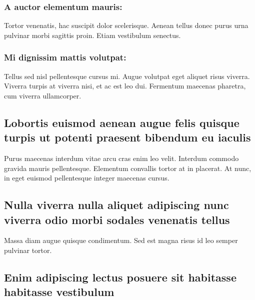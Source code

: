 \documentclass[
]{HyperedReport}
\begin{document}
\subsubsection{A auctor elementum mauris:}

Tortor venenatis, hac suscipit dolor scelerisque. Aenean tellus donec purus urna pulvinar morbi sagittis proin. Etiam vestibulum senectus.

\subsubsection{Mi dignissim mattis volutpat:}

Tellus sed nisl pellentesque cursus mi. Augue volutpat eget aliquet risus viverra. Viverra turpis at viverra nisi, et ac est leo dui. Fermentum maecenas pharetra, cum viverra ullamcorper.

\subsection[Lobortis euismod aenean augue felis quisque\newline turpis ut potenti praesent bibendum eu iaculis]{Lobortis euismod aenean augue felis quisque turpis ut potenti praesent bibendum eu iaculis}

Purus maecenas interdum vitae arcu cras enim leo velit. Interdum commodo gravida mauris pellentesque. Elementum convallis tortor at in placerat. At nunc, in eget euismod pellentesque integer maecenas cursus.

\subsection[Nulla viverra nulla aliquet adipiscing nunc\newline viverra odio morbi sodales venenatis tellus]{Nulla viverra nulla aliquet adipiscing nunc viverra odio morbi sodales venenatis tellus}

Massa diam augue quisque condimentum. Sed est magna risus id leo semper pulvinar tortor.

\subsection[Enim adipiscing lectus posuere sit habitasse\newline habitasse vestibulum]{Enim adipiscing lectus posuere sit habitasse habitasse vestibulum}
\end{document}
